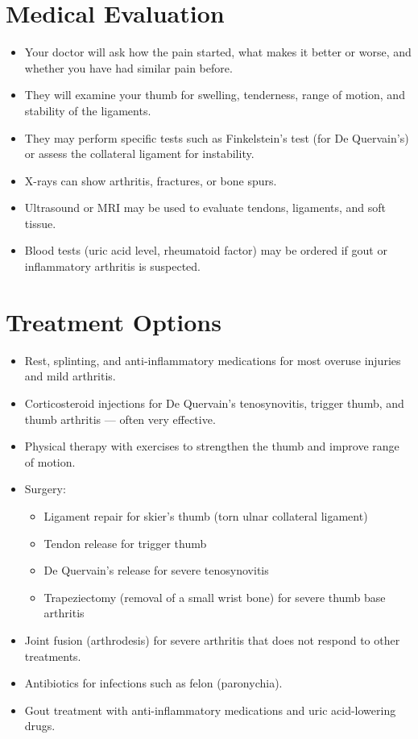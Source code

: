 \section*{Medical Evaluation}
\begin{itemize}
  \item Your doctor will ask how the pain started, what makes it better or worse, and whether you have had similar pain before.
  \item They will examine your thumb for swelling, tenderness, range of motion, and stability of the ligaments.
  \item They may perform specific tests such as Finkelstein's test (for De Quervain's) or assess the collateral ligament for instability.
  \item X-rays can show arthritis, fractures, or bone spurs.
  \item Ultrasound or MRI may be used to evaluate tendons, ligaments, and soft tissue.
  \item Blood tests (uric acid level, rheumatoid factor) may be ordered if gout or inflammatory arthritis is suspected.
\end{itemize}

\section*{Treatment Options}
\begin{itemize}
  \item Rest, splinting, and anti-inflammatory medications for most overuse injuries and mild arthritis.
  \item Corticosteroid injections for De Quervain's tenosynovitis, trigger thumb, and thumb arthritis — often very effective.
  \item Physical therapy with exercises to strengthen the thumb and improve range of motion.
  \item Surgery:
    \begin{itemize}
      \item Ligament repair for skier's thumb (torn ulnar collateral ligament)
      \item Tendon release for trigger thumb
      \item De Quervain's release for severe tenosynovitis
      \item Trapeziectomy (removal of a small wrist bone) for severe thumb base arthritis
    \end{itemize}
  \item Joint fusion (arthrodesis) for severe arthritis that does not respond to other treatments.
  \item Antibiotics for infections such as felon (paronychia).
  \item Gout treatment with anti-inflammatory medications and uric acid-lowering drugs.
\end{itemize}

